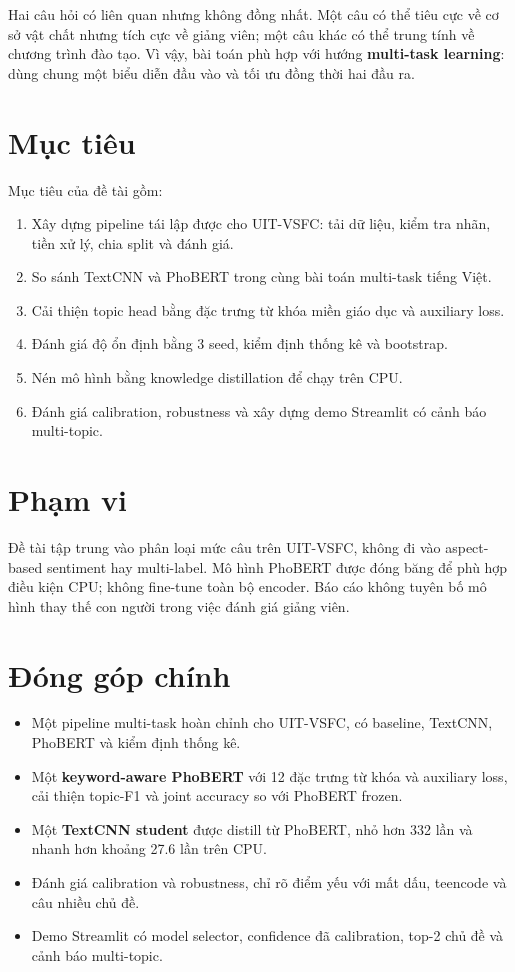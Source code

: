 \documentclass[12pt,a4paper]{report}
\begin{document}
Hai câu hỏi có liên quan nhưng không đồng nhất. Một câu có thể tiêu cực về cơ sở vật chất nhưng tích cực về giảng viên; một câu khác có thể trung tính về chương trình đào tạo. Vì vậy, bài toán phù hợp với hướng \textbf{multi-task learning}: dùng chung một biểu diễn đầu vào và tối ưu đồng thời hai đầu ra.

\section{Mục tiêu}

Mục tiêu của đề tài gồm:

\begin{enumerate}[leftmargin=1.2cm]
  \item Xây dựng pipeline tái lập được cho UIT-VSFC: tải dữ liệu, kiểm tra nhãn, tiền xử lý, chia split và đánh giá.
  \item So sánh TextCNN và PhoBERT trong cùng bài toán multi-task tiếng Việt.
  \item Cải thiện topic head bằng đặc trưng từ khóa miền giáo dục và auxiliary loss.
  \item Đánh giá độ ổn định bằng 3 seed, kiểm định thống kê và bootstrap.
  \item Nén mô hình bằng knowledge distillation để chạy trên CPU.
  \item Đánh giá calibration, robustness và xây dựng demo Streamlit có cảnh báo multi-topic.
\end{enumerate}

\section{Phạm vi}

Đề tài tập trung vào phân loại mức câu trên UIT-VSFC, không đi vào aspect-based sentiment hay multi-label. Mô hình PhoBERT được đóng băng để phù hợp điều kiện CPU; không fine-tune toàn bộ encoder. Báo cáo không tuyên bố mô hình thay thế con người trong việc đánh giá giảng viên.

\section{Đóng góp chính}

\begin{itemize}[leftmargin=1.2cm]
  \item Một pipeline multi-task hoàn chỉnh cho UIT-VSFC, có baseline, TextCNN, PhoBERT và kiểm định thống kê.
  \item Một \textbf{keyword-aware PhoBERT} với 12 đặc trưng từ khóa và auxiliary loss, cải thiện topic-F1 và joint accuracy so với PhoBERT frozen.
  \item Một \textbf{TextCNN student} được distill từ PhoBERT, nhỏ hơn 332 lần và nhanh hơn khoảng 27.6 lần trên CPU.
  \item Đánh giá calibration và robustness, chỉ rõ điểm yếu với mất dấu, teencode và câu nhiều chủ đề.
  \item Demo Streamlit có model selector, confidence đã calibration, top-2 chủ đề và cảnh báo multi-topic.
\end{itemize}
\end{document}
